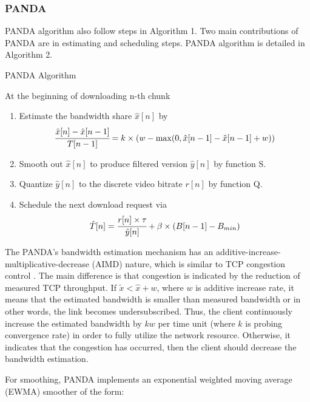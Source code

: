 \documentclass[journal]{IEEEtran}
\begin{document}
\subsubsection {PANDA}
PANDA algorithm \cite{PANDA} also follow steps in Algorithm 1.
Two main contributions of PANDA are in estimating and scheduling steps. PANDA algorithm is detailed in Algorithm 2. 
\begin{algorithm}
	
	
	\caption{PANDA Algorithm}
	
		
	At the beginning of downloading n-th chunk\
    \begin{enumerate}
    	\item Estimate the bandwidth share $\hat{x}[n]$ by\
    	\begin{equation}
\cfrac{\hat{x}[n]-\hat{x}[n-1]}{T[n-1]}=k\times(w-\max(0,\hat{x}[n-1]-\tilde{x}[n-1]+w))
\label{BOLA bw}
    	\end{equation}
    	\item
    	Smooth out $\hat{x}[n]$ to produce filtered version $\hat{y}[n]$ by function S.
    	\item Quantize  $\hat{y}[n]$ to the discrete video bitrate $r[n]$ by function Q.
    	\item Schedule the next download request via
    	\begin{equation}
    	\hat{T}[n]=\cfrac{r[n]\times\tau}{\hat{y}[n]}+\beta\times(B[n-1]-B_{min})
    	\label{BOLA buff}
    	\end{equation}
    \end{enumerate}

		
\end{algorithm}
\par The PANDA's bandwidth estimation mechanism has an additive-increase-multiplicative-decrease (AIMD) nature, which is similar to TCP congestion control \cite{congestion}. The main difference is that congestion is indicated by the
reduction of measured TCP throughput. If $\tilde{x}<\hat{x}+w$, where $w$ is additive increase rate, it means that the estimated bandwidth is smaller than measured bandwidth or in other words, the link becomes undersubscribed. Thus, the client continuously increase the estimated bandwidth by $kw$ per time unit (where $k$ is probing convergence rate) in order to fully utilize the network resource. Otherwise, it indicates that the congestion has occurred, then the client should decrease the bandwidth estimation. 
\par For smoothing, PANDA implements an exponential weighted moving average (EWMA) smoother of the form:
\end{document}
